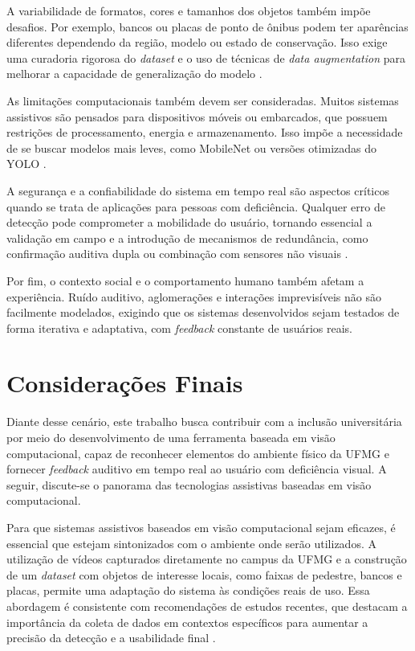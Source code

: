 A variabilidade de formatos, cores e tamanhos dos objetos também impõe desafios. Por exemplo, bancos ou placas de ponto de ônibus podem ter aparências diferentes dependendo da região, modelo ou estado de conservação. Isso exige uma curadoria rigorosa do \textit{dataset} e o uso de técnicas de \textit{data augmentation} para melhorar a capacidade de generalização do modelo \cite{Shorten2019}.

As limitações computacionais também devem ser consideradas. Muitos sistemas assistivos são pensados para dispositivos móveis ou embarcados, que possuem restrições de processamento, energia e armazenamento. Isso impõe a necessidade de se buscar modelos mais leves, como MobileNet ou versões otimizadas do YOLO \cite{Tan2019}.

A segurança e a confiabilidade do sistema em tempo real são aspectos críticos quando se trata de aplicações para pessoas com deficiência. Qualquer erro de detecção pode comprometer a mobilidade do usuário, tornando essencial a validação em campo e a introdução de mecanismos de redundância, como confirmação auditiva dupla ou combinação com sensores não visuais \cite{Milella2014}.

Por fim, o contexto social e o comportamento humano também afetam a experiência. Ruído auditivo, aglomerações e interações imprevisíveis não são facilmente modelados, exigindo que os sistemas desenvolvidos sejam testados de forma iterativa e adaptativa, com \textit{feedback} constante de usuários reais.

\section{Considerações Finais}

Diante desse cenário, este trabalho busca contribuir com a inclusão universitária por meio do desenvolvimento de uma ferramenta baseada em visão computacional, capaz de reconhecer elementos do ambiente físico da UFMG e fornecer \textit{feedback} auditivo em tempo real ao usuário com deficiência visual. A seguir, discute-se o panorama das tecnologias assistivas baseadas em visão computacional. 

Para que sistemas assistivos baseados em visão computacional sejam eficazes, é essencial que estejam sintonizados com o ambiente onde serão utilizados. A utilização de vídeos capturados diretamente no campus da UFMG e a construção de um \textit{dataset} com objetos de interesse locais, como faixas de pedestre, bancos e placas, permite uma adaptação do sistema às condições reais de uso. Essa abordagem é consistente com recomendações de estudos recentes, que destacam a importância da coleta de dados em contextos específicos para aumentar a precisão da detecção e a usabilidade final \cite{Borges2023}. 